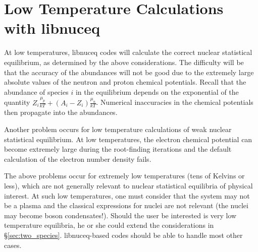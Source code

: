 \documentclass{article}    %
\begin{document}
\section{Low Temperature Calculations with libnuceq}

At low temperatures, libnuceq codes will calculate the correct nuclear
statistical equilibrium, as determined by the above considerations.
The difficulty will be that the accuracy of the abundances will not be
good due to the extremely large absolute values of the neutron and
proton chemical potentials.  Recall that the abundance of species $i$
in the equilibrium depends on the exponential of the quantity
$Z_i \frac{\mu_p}{kT} + \left(A_i - Z_i\right) \frac{\mu_n}{kT}$.
Numerical inaccuracies in the chemical potentials then propagate into
the abundances.

Another problem occurs for low temperature calculations of weak nuclear
statistical equilibrium.  At low temperatures, the electron chemical potential
can become extremely large during the root-finding iterations and the
default calculation of the electron number density fails.

The above problems occur for extremely low temperatures (tens of Kelvins
or less), which are not generally relevant to nuclear statistical equilibria of
physical interest.  At such low temperatures, one must consider that
the system may not be a plasma and the classical expressions for nuclei
are not relevant (the nuclei may become boson condensates!).  Should the
user be interested is very low temperature equilibria, he or she could extend
the considerations in \S \ref{sec:two_species}.  libnuceq-based codes should
be able to handle most other cases.
\end{document}
